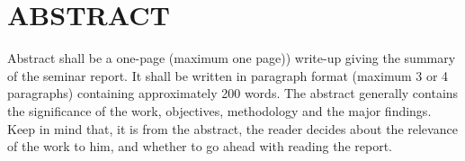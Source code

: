 


\chapter*{\centering \textbf{\MakeUppercase{ABSTRACT}}}

 
Abstract shall be a one-page (maximum one page)) write-up giving the summary 
of the seminar report. 
It shall be written in paragraph format (maximum 3 or 4 paragraphs) containing 
approximately 200 words. 
The abstract generally contains the significance of the work, objectives, 
methodology and the major findings. 
Keep in mind that, it is from the abstract, the reader decides about the relevance 
of the work to him, and whether to go ahead with reading the report. 


